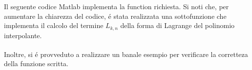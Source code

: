 \begin{center}
\footnotesize\noindent{}\end{center}

\noindent Il seguente codice Matlab implementa la function richiesta. Si noti che, per aumentare la chiarezza del codice, \'e stata realizzata una sottofunzione che implementa il calcolo del termine \(L_{k,n}\) della forma di Lagrange del polinomio interpolante.\\ \\
\noindent Inoltre, si \'e provveduto a realizzare un banale esempio per verificare la corretteza della funzione scritta.


